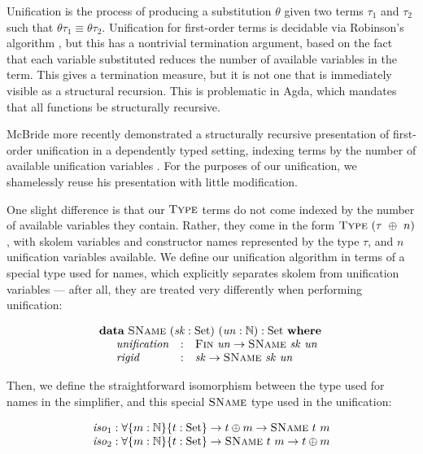 \documentclass[a4paper]{jfp}
\begin{document}
Unification is the process of producing a substitution $\theta$ given two terms $\tau_1$ and $\tau_2$ such that $\theta\tau_1 \equiv \theta\tau_2$.
Unification for first-order terms is decidable via Robinson's algorithm \cite{Robinson:1965:MLB:321250.321253}, but this has a nontrivial termination
argument, based on the fact that each variable substituted reduces the number of available variables in the term. This gives a termination measure,
but it is not one that is immediately visible as a structural recursion. This is problematic in Agda, which mandates that all functions be
structurally recursive. 

McBride more recently demonstrated a structurally recursive presentation of first-order unification in a dependently typed setting, indexing terms
by the number of available unification variables \cite{McBride:2003bg}. For the purposes of our unification, we shamelessly reuse his presentation
with little modification.

One slight difference is that our $\textsc{Type}$ terms do not come indexed by the number of available variables they contain. Rather, they 
come in the form $\textsc{Type}\ (\tau\ \oplus\ n)$, with skolem variables and constructor names represented by the type $\tau$, and $n$ unification 
variables available. We define our unification algorithm in terms of a special type used for names, which explicitly separates skolem from unification
variables --- after all, they are treated very differently when performing unification:

\begin{displaymath}
   \begin{array}{l}
   \textbf{data}\ \textsc{SName}\ (\mathit{sk} : \text{Set})\ (\mathit{un} : \mathbb{N}) : \text{Set}\ \textbf{where} \\
   \quad \begin{array}{lll}
      \mathit{unification} & : & \textsc{Fin}\ \mathit{un} \rightarrow \textsc{SName}\ \mathit{sk}\ \mathit{un} \\
      \mathit{rigid}       & : & \mathit{sk} \rightarrow \textsc{SName}\ \mathit{sk}\ \mathit{un}
    \end{array}
   \end{array}
\end{displaymath}

Then, we define the straightforward isomorphism between the type used for names in the simplifier, and this special $\textsc{SName}$ type used in the
unification:

\begin{displaymath}
   \begin{array}{l}
      \mathit{iso}_1 : \forall \{m : \mathbb{N}\}\{t : \text{Set} \} \rightarrow t \oplus m \rightarrow \textsc{SName}\ t\ m \\
      \mathit{iso}_2 : \forall \{m : \mathbb{N}\}\{t : \text{Set} \} \rightarrow \textsc{SName}\ t\ m \rightarrow t \oplus m
   \end{array}
\end{displaymath}
\end{document}
